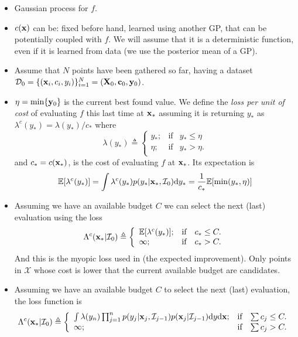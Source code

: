 \documentclass{article} %
\newcommand{\I}{\mathcal{I}}
\newcommand{\ud}{\mathrm{d}}
\newcommand{\E}{\mathbb{E}}
\newcommand{\cost}{\textbf{c}}
\begin{document}
\begin{itemize}
\item Gaussian process for $f$.
\item $c(\mathbf{x})$ can be: fixed before hand, learned using another GP, that can be potentially coupled with $f$. We will assume that it is a deterministic function, even if it is learned from data (we use the posterior mean of a GP).
\item Assume that $N$ points have been gathered so far, having a dataset $\dataSet_0 = \{(\latentVector_i,c_i ,\dataScalar_i)\}_{i=1}^N = (\latentMatrix_0, \cost_0,\dataVector_0)$.
\item $\eta = \min \{\mathbf{y}_0\}$ is the current best found value. We define the \emph{loss per unit of cost} of evaluating $f$ this last time at $\mathbf{x}_*$ assuming it is returning $y_*$ as $\lambda^c(y_*) = \lambda(y_*)/c_*$ where
$$\lambda(y_*)\triangleq \left\{ \begin{array}{lcl}
y_*;             & \mbox{if}  &  y_* \leq \eta \\
\eta; & \mbox{if}  & y_* > \eta. \\
\end{array}
\right.$$
and  $c_* = c(\mathbf{x}_*)$, is the cost of evaluating $f$ at $\mathbf{x}_*$.
Its expectation is 
$$ \E[ \lambda^c(y_*)] =  \int \lambda^c(y_*)p(y_* |\latentVector_*,\I_0)\ud y_* =  \frac1{c_*} \E[ \min (y_*,\eta)]$$
\item Assuming we have an available budget $C$ we can select the next (last) evaluation using the loss 
$$\Lambda^c(\latentVector_*| \I_0)\triangleq \left\{ \begin{array}{lcl}
 \E[ \lambda^c(y_*)];             & \mbox{if}  &  c_* \leq C. \\
\infty; & \mbox{if}  & c_* > C. \\
\end{array}
\right.$$
And this is the myopic loss used in \cite{Snoek*Larochelle*Adams_2012} (the expected improvement).  Only points in ${\mathcal X}$ whose cost is lower that the current available budget are candidates.
\item Assuming we have an available budget $C$ to select the next (last) evaluation, the loss function is 
$$\Lambda^c(\latentVector_*| \I_0)\triangleq \left\{ \begin{array}{lcl}
 \int \lambda(y_n) \prod_{j=1}^{n}p(y_{j}|\latentVector_{j},\I_{j-1}) p(\latentVector_{j}|\I_{j-1}) \ud y \ud\latentVector;             & \mbox{if}  &  \sum c_j \leq C. \\
\infty; & \mbox{if}  & \sum c_j > C. \\
\end{array}
\right.$$


\end{itemize}
\end{document}
